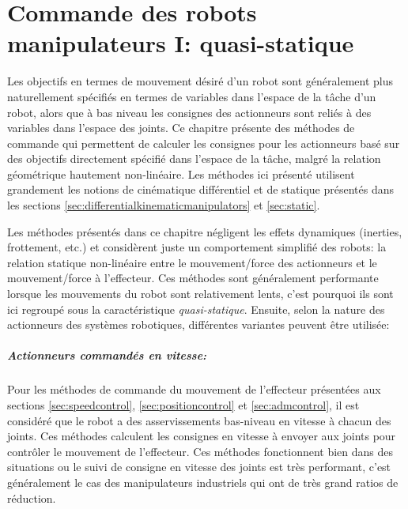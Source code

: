 \chapter{Commande des robots manipulateurs I: quasi-statique}
\label{sec:staticcontrol}


Les objectifs en termes de mouvement désiré d'un robot sont généralement plus naturellement spécifiés en termes de variables dans l'espace de la tâche d'un robot, alors que à bas niveau les consignes des actionneurs sont reliés à des variables dans l'espace des joints. Ce chapitre présente des méthodes de commande qui permettent de calculer les consignes pour les actionneurs basé sur des objectifs directement spécifié dans l'espace de la tâche, malgré la relation géométrique hautement non-linéaire. Les méthodes ici présenté utilisent grandement les notions de cinématique différentiel et de statique présentés dans les sections \ref{sec:differentialkinematicmanipulators} et \ref{sec:static}.

Les méthodes présentés dans ce chapitre négligent les effets dynamiques (inerties, frottement, etc.) et considèrent juste un comportement simplifié des robots: la relation statique non-linéaire entre le mouvement/force des actionneurs et le mouvement/force à l'effecteur. Ces méthodes sont généralement performante lorsque les mouvements du robot sont relativement lents, c'est pourquoi ils sont ici regroupé sous la caractéristique \textit{quasi-statique}. Ensuite, selon la nature des actionneurs des systèmes robotiques, différentes variantes peuvent être utilisée:

\paragraph{Actionneurs commandés en vitesse:} Pour les méthodes de commande du mouvement de l'effecteur présentées aux sections \ref{sec:speedcontrol}, \ref{sec:positioncontrol} et \ref{sec:admcontrol}, il est considéré que le robot a des asservissements bas-niveau en vitesse à chacun des joints. Ces méthodes calculent les consignes en vitesse à envoyer aux joints pour contrôler le mouvement de l'effecteur. Ces méthodes fonctionnent bien dans des situations ou le suivi de consigne en vitesse des joints est très performant, c'est généralement le cas des manipulateurs industriels qui ont de très grand ratios de réduction. 

